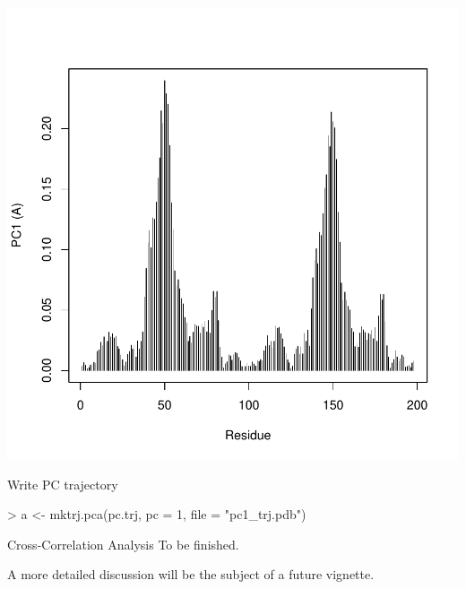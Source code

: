 \documentclass[a4paper]{article}
\begin{document}
\begin{center}
\begin{Schunk}
\end{Schunk}
\includegraphics{figs/fig-045}
\end{center}

Write PC trajectory
\begin{Schunk}
\begin{Sinput}
> a <- mktrj.pca(pc.trj, pc = 1, file = "pc1_trj.pdb")
\end{Sinput}
\end{Schunk}


Cross-Correlation Analysis
To be finished.

A more detailed discussion will be the subject of a future vignette.
\end{document}
